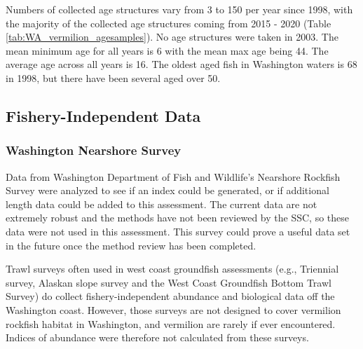 \documentclass[11pt,
  english,
  a4paper,
]{article}
\begin{document}
Numbers of collected age structures vary from 3 to 150 per year since 1998, with the majority of the collected age structures coming from 2015 - 2020 (Table \ref{tab:WA_vermilion_agesamples}). No age structures were taken in 2003. The mean minimum age for all years is 6 with the mean max age being 44. The average age across all years is 16. The oldest aged fish in Washington waters is 68 in 1998, but there have been several aged over 50.

\leavevmode\tagmcend\tagstructend\par


\hypertarget{fishery-independent-data}{%
\subsection{Fishery-Independent Data}\label{fishery-independent-data}}

\leavevmode\tagmcend\tagstructend


\hypertarget{washington-nearshore-survey}{%
\subsubsection{Washington Nearshore Survey}\label{washington-nearshore-survey}}

\leavevmode\tagmcend\tagstructend


Data from Washington Department of Fish and Wildlife's Nearshore Rockfish Survey were analyzed to see if an index could be generated, or if additional length data could be added to this assessment. The current data are not extremely robust and the methods have not been reviewed by the SSC, so these data were not used in this assessment. This survey could prove a useful data set in the future once the method review has been completed.

\leavevmode\tagmcend\tagstructend\par


Trawl surveys often used in west coast groundfish assessments (e.g., Triennial survey, Alaskan slope survey and the West Coast Groundfish Bottom Trawl Survey) do collect fishery-independent abundance and biological data off the Washington coast. However, those surveys are not designed to cover vermilion rockfish habitat in Washington, and vermilion are rarely if ever encountered. Indices of abundance were therefore not calculated from these surveys.
\end{document}
